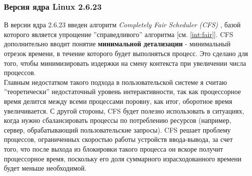 \subsubsection{Версия ядра Linux 2.6.23}
\label{linux:cfs}
В версии ядра 2.6.23 введен алгоритм \textit{Completely Fair Scheduler (CFS)} \cite{ibmLinuxCFS} \cite{lav}, базой которого является упрощение ''справедливого'' алгоритма [см. \ref{int:fair}]. CFS дополнительно вводит понятие \textbf{минимальной детализации} - минимальный отрезок времени, в течение которого будет выполняться процесс. Это сделано для того, чтобы минимизировать издержки на смену контекста при увеличении числа процессов.\\
Главным недостатком такого подхода в пользовательской системе я считаю ''теоретически'' недостаточный уровень интерактивности, так как процессорное время делится между всеми процессами поровну, как итог, оборотное время увеличивается. С другой стороны, CFS будет полезно использовать в ситуациях, когда нужно сбалансировать процессы по потреблению ресурсов (например, сервер, обрабатывающий пользовательские запросы). CFS решает проблему процессов, ограниченных скоростью работы устройств ввода-вывода, за счет того, что после выхода из блокировки такого процесса он вскоре получит процессорное время, поскольку его доля суммарного израсходованного времени будет меньше необходимой.

